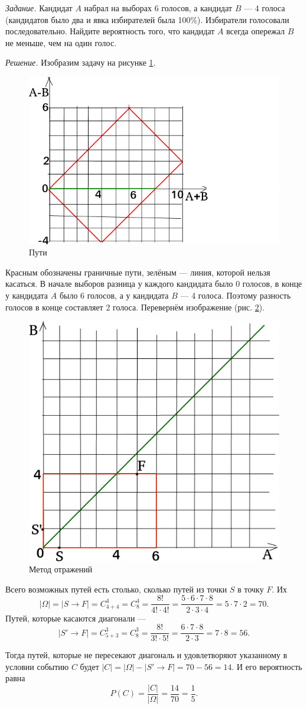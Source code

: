 \textit{Задание.} Кандидат $A$ набрал на выборах 6 голосов, а кандидат $B$ --- 4 голоса (кандидатов было два и явка избирателей была 100\%).
Избиратели голосовали последовательно.
Найдите вероятность того, что кандидат $A$ всегда опережал $B$ не меньше, чем на один голос.

\textit{Решение.} Изобразим задачу на рисунке \ref{fig:23}.

\begin{figure}[h!]
  \centering
  \includegraphics[width=.4\textwidth]{./pictures/t1v2_3.png}
  \caption{Пути}
  \label{fig:23}
\end{figure}

Красным обозначены граничные пути, зелёным --- линия, которой нельзя касаться.
В начале выборов разница у каждого кандидата было 0 голосов, в конце у кандидата $A$ было 6 голосов, а у кандидата $B$ --- 4 голоса.
Поэтому разность голосов в конце составляет 2 голоса.
Перевернём изображение (рис. \ref{fig:231}).

\begin{figure}[h!]
  \centering
  \includegraphics[width=.4\textwidth]{./pictures/t1v2_31.png}
  \caption{Метод отражений}
  \label{fig:231}
\end{figure}

Всего возможных путей есть столько, сколько путей из точки $S$ в точку $F$.
Их
$$ \left| \Omega \right| =
\left| S \rightarrow F \right| =
C_{4+4}^4 =
C_{8}^4 =
\frac{8!}{4! \cdot 4!} =
\frac{5 \cdot 6 \cdot 7 \cdot 8}{2 \cdot 3 \cdot 4} =
5 \cdot 7 \cdot 2 =
70.$$
Путей, которые касаются диагонали ---
$$ \left| S' \rightarrow F \right| =
C_{5+3}^3 =
C_8^3 =
\frac{8!}{3! \cdot 5!} =
\frac{6 \cdot 7 \cdot 8}{2 \cdot 3} =
7 \cdot 8 =
56.$$

Тогда путей,
которые не пересекают диагональ и удовлетворяют указанному в условии событию $C$ будет
$ \left| C \right| =
\left| \Omega \right| - \left| S' \rightarrow F \right| =
70 - 56 =
14$.
И его вероятность равна
$$P \left( C \right) =
\frac{ \left| C \right| }{ \left| \Omega \right| } =
\frac{14}{70} =
\frac{1}{5}.$$
